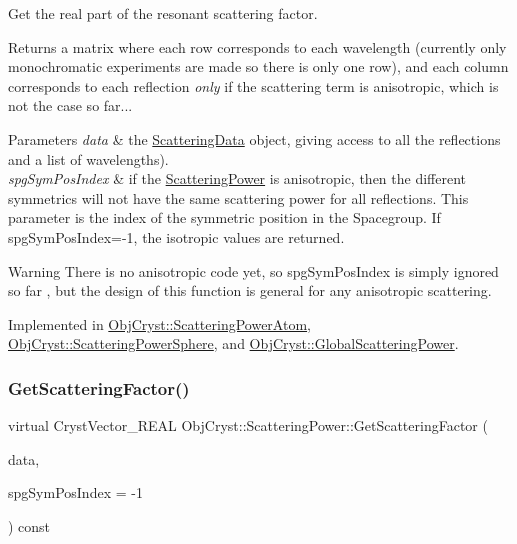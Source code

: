 Get the real part of the resonant scattering factor. 

\begin{DoxyReturn}{Returns}
a matrix where each row corresponds to each wavelength (currently only monochromatic experiments are made so there is only one row), and each column corresponds to each reflection {\itshape only} if the scattering term is anisotropic, which is not the case so far... 
\end{DoxyReturn}

\begin{DoxyParams}{Parameters}
{\em data} & the \mbox{\hyperlink{class_obj_cryst_1_1_scattering_data}{Scattering\+Data}} object, giving access to all the reflections and a list of wavelengths). \\
\hline
{\em spg\+Sym\+Pos\+Index} & if the \mbox{\hyperlink{class_obj_cryst_1_1_scattering_power}{Scattering\+Power}} is anisotropic, then the different symmetrics will not have the same scattering power for all reflections. This parameter is the index of the symmetric position in the Spacegroup. If spg\+Sym\+Pos\+Index=-\/1, the isotropic values are returned. \\
\hline
\end{DoxyParams}
\begin{DoxyWarning}{Warning}
There is no anisotropic code yet, so spg\+Sym\+Pos\+Index is simply ignored so far , but the design of this function is general for any anisotropic scattering. 
\end{DoxyWarning}


Implemented in \mbox{\hyperlink{class_obj_cryst_1_1_scattering_power_atom_a38d48cd95ad51e9d83bfeb59988492c1}{Obj\+Cryst\+::\+Scattering\+Power\+Atom}}, \mbox{\hyperlink{class_obj_cryst_1_1_scattering_power_sphere_ae4bfc8319aa74f69eca021050f8d445d}{Obj\+Cryst\+::\+Scattering\+Power\+Sphere}}, and \mbox{\hyperlink{class_obj_cryst_1_1_global_scattering_power_a9dd42d2bf3990261d0ba88a8478dd45a}{Obj\+Cryst\+::\+Global\+Scattering\+Power}}.

\mbox{\label{class_obj_cryst_1_1_scattering_power_af18f3eaaf45af87bc3a2a0ff21bc34b6}} 
\subsubsection{\texorpdfstring{GetScatteringFactor()}{GetScatteringFactor()}}
{\footnotesize\ttfamily virtual Cryst\+Vector\+\_\+\+R\+E\+AL Obj\+Cryst\+::\+Scattering\+Power\+::\+Get\+Scattering\+Factor (\begin{DoxyParamCaption}\item[{const \mbox{\hyperlink{class_obj_cryst_1_1_scattering_data}{Scattering\+Data}} \&}]{data,  }\item[{const int}]{spg\+Sym\+Pos\+Index = {\ttfamily -\/1} }\end{DoxyParamCaption}) const\hspace{0.3cm}{\ttfamily [pure virtual]}}



